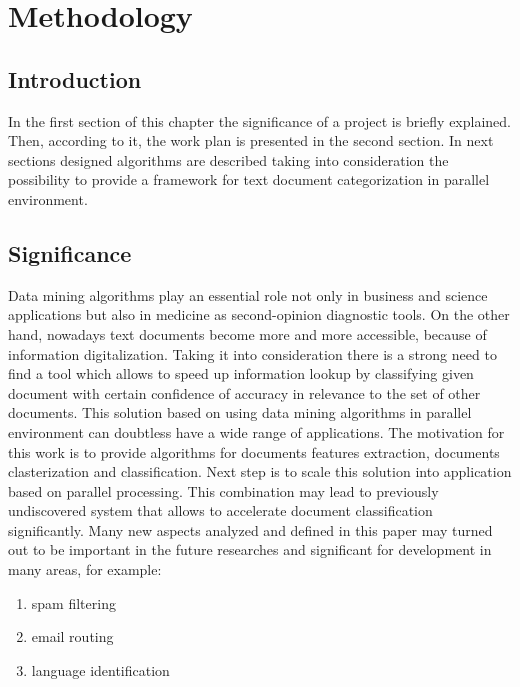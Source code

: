 \chapter{Methodology}
\label{methodology}

\section{Introduction}
In the first section of this chapter the significance of a project is briefly explained. Then, according to it, the work plan is presented in the second section.  In next sections designed algorithms are described taking into consideration the possibility to provide a framework for text document categorization in parallel environment. 

\section{Significance}
Data mining algorithms play an essential role not only in business and science applications but also in medicine as second-opinion diagnostic tools. On the other hand, nowadays text documents become more and more accessible, because of information digitalization. Taking it into consideration there is a strong need to find a tool which allows to speed up information lookup by classifying given document with certain confidence of accuracy in relevance to the set of other documents. This solution based on using data mining algorithms in parallel environment can doubtless have a wide range of applications. The motivation for this work is to provide algorithms for documents features extraction, documents clasterization and classification. Next step is to scale this solution into application based on parallel processing. This combination may lead to previously undiscovered system that allows to accelerate document classification significantly. Many new aspects analyzed and defined in this paper may turned out to be important in the future researches and significant for development in many areas, for example:
\begin{enumerate}

\item spam filtering

\item email routing

\item language identification


\end{enumerate}


